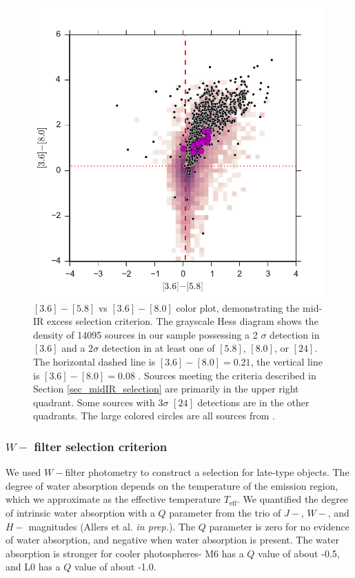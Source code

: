 \begin{figure}[ht!]
  \caption[Mid-infrared color selection]{$[3.6]-[5.8]$ vs $[3.6]-[8.0]$ color plot, demonstrating the mid-IR excess selection criterion.  The grayscale Hess diagram shows the density of 14095 sources in our sample possessing a 2 $\sigma$ detection in $[3.6]$ and a 2$\sigma$ detection in at least one of $[5.8]$, $[8.0]$, or $[24]$.  The horizontal dashed line is $[3.6]-[8.0]=0.21$, the vertical line is $[3.6]-[8.0]=0.08$ \citep{2006ApJ...651..502P}.  Sources meeting the criteria described in Section \ref{sec_midIR_selection} are primarily in the upper right quadrant.  Some sources with 3$\sigma$ $[24]$ detections are in the other quadrants.  The large colored circles are all sources from \citet{allers06}. \label{fig_midIR_selection}}
\centering
\includegraphics[scale=0.6]{chIMACS/figures/disk_selection_allers}
\end{figure}

\subsubsection{$W-$ filter selection criterion}
We used $W-$filter photometry to construct a selection for late-type objects.  The degree of water absorption depends on the temperature of the emission region, which we approximate as the effective temperature $T_{\mathrm{eff}}$.  We  quantified the degree of intrinsic water absorption with a $Q$ parameter from the trio of $J-$, $W-$, and $H-$ magnitudes (Allers et al. \emph{in prep.}).  The $Q$ parameter is zero for no evidence of water absorption, and negative when water absorption is present.  The water absorption is stronger for cooler photospheres- M6 has a $Q$ value of about -0.5, and L0 has a $Q$ value of about -1.0.  

